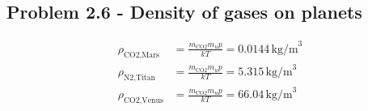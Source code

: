 \documentclass[../main.tex]{subfiles}
\begin{document}
\subsection{Problem 2.6 - Density of gases on planets}
\begin{align}
\rho_\text{CO2,Mars}&=\frac{m_\text{CO2}m_u p}{kT}=0.0144\,\text{kg/m}^3\\
\rho_\text{N2,Titan}&=\frac{m_\text{CO2}m_u p}{kT}=5.315\,\text{kg/m}^3\\
\rho_\text{CO2,Venus}&=\frac{m_\text{CO2}m_u p}{kT}=66.04\,\text{kg/m}^3\\
\end{align}
\end{document}
